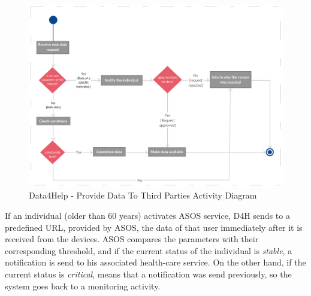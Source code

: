 \documentclass[a4paper, hidelinks, 12pt]{report}
\begin{document}
	\begin{figure}[H]
		\centering
		\includegraphics[width=1\textwidth]{Diagrams/d4h_activity_diagram.png}
		\caption[Data4Help - Provide Data To Third Parties Activity Diagram]{Data4Help - Provide Data To Third Parties Activity Diagram}
		\label{fig:d4h_act_provide_data}
	\end{figure}
	
		If an individual (older than 60 years) activates ASOS service, D4H sends to a predefined URL, provided by ASOS, the data of that user immediately after it is received from the devices. ASOS compares the parameters with their corresponding threshold, and if the current status of the individual is \textit{stable}, a notification is send to his associated health-care service. On the other hand, if the current status is \textit{critical}, means that a notification was send previously, so the system goes back to a monitoring activity. \\
		
\end{document}
